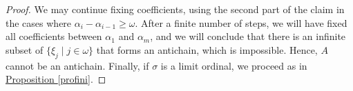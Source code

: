 \documentclass[10pt,a4paper]{amsart}
\begin{document}
\begin{proof}
    We may continue fixing coefficients, using the second part of the claim in the cases where $\alpha_i - \alpha_{i-1} \geq \omega$. After a finite number of steps, we will have fixed all coefficients between $\alpha_1$ and $\alpha_m$, and we will conclude that there is an infinite subset of $\{\xi_j \mid j \in \omega\}$ that forms an antichain, which is impossible. Hence, $A$ cannot be an antichain. Finally, if $\sigma$ is a limit ordinal, we proceed as in \hyperref[profini]{Proposition \ref{profini}}.
\end{proof}
\end{document}
